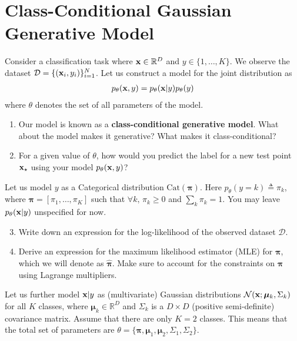 \documentclass[11pt]{article}
\begin{document}
\newpage
\section{Class-Conditional Gaussian Generative Model}

Consider a classification task where ${\mathbf x} \in \mathbb{R}^D$ and $y \in \{1,\ldots, K\}$. We observe the dataset $\mathcal{D} = \{({\mathbf x}_i,y_i)\}_{i=1}^N$. Let us construct a model for the joint distribution as
\begin{align*}
    p_\theta({\mathbf x},y) = p_\theta({\mathbf x}|y)p_\theta(y)
\end{align*}
where $\theta$ denotes the set of all parameters of the model.

\begin{enumerate}[label=(\Alph*)]

    \item Our model is known as a \textbf{class-conditional generative model}. What about the model makes it generative? What makes it class-conditional?

    \item For a given value of $\theta$, how would you predict the label for a new test point ${\mathbf x}_\star$ using your model $p_\theta({\mathbf x},y)$?

\end{enumerate}

\noindent Let us model $y$ as a Categorical distribution $\text{Cat}(\bm{\pi})$. Here $p_\theta(y=k) \triangleq \pi_k$, where $\bm{\pi}=[\pi_1,\ldots,\pi_K]$ such that $\forall k,\, \pi_k \geq 0$ and $\sum_k \pi_k=1$. You may leave $p_\theta({\mathbf x}|y)$ unspecified for now.

\begin{enumerate}[label=(\Alph*)]
\setcounter{enumi}{2}

    \item Write down an expression for the log-likelihood of the observed dataset $\mathcal{D}$.

    \item Derive an expression for the maximum likelihood estimator (MLE) for $\bm{\pi}$, which we will denote as $\widehat{\bm{\pi}}$. Make sure to account for the constraints on $\bm{\pi}$ using Lagrange multipliers.

\end{enumerate}

\noindent Let us further model ${\mathbf x}|y$ as (multivariate) Gaussian distributions $\mathcal{N}({\mathbf x}; \bm{\mu}_k, \Sigma_k)$ for all $K$ classes, where $\bm{\mu}_k \in \mathbb{R}^D$ and $\Sigma_k$ is a $D \times D$ (positive semi-definite) covariance matrix. Assume that there are only $K=2$ classes. This means that the total set of parameters are $\theta=\{\bm{\pi},\bm{\mu}_1, \bm{\mu}_2,\Sigma_1,\Sigma_2\}$.\\
\end{document}

